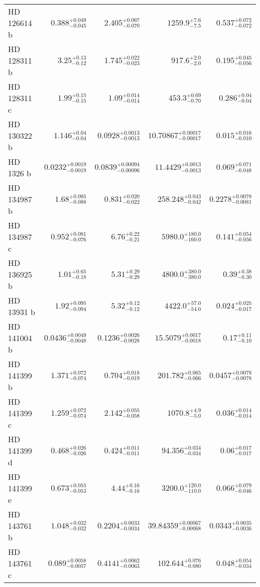 \begin{longtable*}{lrrrr}
HD 126614 b & $0.388^{+0.049}_{-0.045}$ & $2.405^{+0.067}_{-0.070}$ & $1259.9^{+7.6}_{-7.5}$ & $0.537^{+0.072}_{-0.072}$ \\ 
HD 128311 b & $3.25^{+0.13}_{-0.12}$ & $1.745^{+0.022}_{-0.023}$ & $917.6^{+2.0}_{-2.0}$ & $0.195^{+0.045}_{-0.056}$ \\ 
HD 128311 c & $1.99^{+0.15}_{-0.15}$ & $1.09^{+0.014}_{-0.014}$ & $453.3^{+0.69}_{-0.70}$ & $0.286^{+0.04}_{-0.04}$ \\ 
HD 130322 b & $1.146^{+0.04}_{-0.04}$ & $0.0928^{+0.0013}_{-0.0013}$ & $10.70867^{+0.00017}_{-0.00017}$ & $0.015^{+0.016}_{-0.010}$ \\ 
HD 1326 b & $0.0232^{+0.0019}_{-0.0019}$ & $0.0839^{+0.00094}_{-0.00096}$ & $11.4429^{+0.0013}_{-0.0013}$ & $0.069^{+0.071}_{-0.048}$ \\ 
HD 134987 b & $1.68^{+0.085}_{-0.088}$ & $0.831^{+0.020}_{-0.022}$ & $258.248^{+0.043}_{-0.042}$ & $0.2278^{+0.0078}_{-0.0081}$ \\ 
HD 134987 c & $0.952^{+0.081}_{-0.076}$ & $6.76^{+0.22}_{-0.21}$ & $5980.0^{+180.0}_{-160.0}$ & $0.141^{+0.054}_{-0.056}$ \\ 
HD 136925 b & $1.01^{+0.65}_{-0.18}$ & $5.31^{+0.29}_{-0.29}$ & $4800.0^{+380.0}_{-380.0}$ & $0.39^{+0.38}_{-0.30}$ \\ 
HD 13931 b & $1.92^{+0.095}_{-0.094}$ & $5.32^{+0.12}_{-0.12}$ & $4422.0^{+57.0}_{-54.0}$ & $0.024^{+0.025}_{-0.017}$ \\ 
HD 141004 b & $0.0436^{+0.0049}_{-0.0048}$ & $0.1236^{+0.0026}_{-0.0028}$ & $15.5079^{+0.0017}_{-0.0018}$ & $0.17^{+0.11}_{-0.10}$ \\ 
HD 141399 b & $1.371^{+0.072}_{-0.074}$ & $0.704^{+0.018}_{-0.019}$ & $201.782^{+0.065}_{-0.066}$ & $0.0457^{+0.0078}_{-0.0078}$ \\ 
HD 141399 c & $1.259^{+0.072}_{-0.074}$ & $2.142^{+0.055}_{-0.058}$ & $1070.8^{+4.9}_{-5.0}$ & $0.036^{+0.014}_{-0.014}$ \\ 
HD 141399 d & $0.468^{+0.026}_{-0.026}$ & $0.424^{+0.011}_{-0.011}$ & $94.356^{+0.034}_{-0.034}$ & $0.06^{+0.017}_{-0.017}$ \\ 
HD 141399 e & $0.673^{+0.055}_{-0.053}$ & $4.44^{+0.16}_{-0.16}$ & $3200.0^{+120.0}_{-110.0}$ & $0.066^{+0.079}_{-0.046}$ \\ 
HD 143761 b & $1.048^{+0.032}_{-0.032}$ & $0.2204^{+0.0033}_{-0.0034}$ & $39.84359^{+0.00067}_{-0.00068}$ & $0.0343^{+0.0035}_{-0.0036}$ \\ 
HD 143761 c & $0.089^{+0.0058}_{-0.0057}$ & $0.4141^{+0.0062}_{-0.0063}$ & $102.644^{+0.076}_{-0.080}$ & $0.048^{+0.054}_{-0.034}$ \\ 

\end{longtable*}
